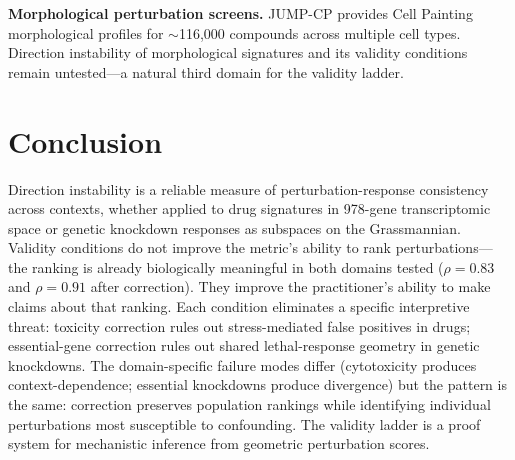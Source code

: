\documentclass{article}
\begin{document}
\textbf{Morphological perturbation screens.} JUMP-CP provides Cell Painting
morphological profiles for ${\sim}$116{,}000 compounds across multiple cell
types. Direction instability of morphological signatures and its validity
conditions remain untested---a natural third domain for the validity ladder.

\section{Conclusion}

Direction instability is a reliable measure of perturbation-response
consistency across contexts, whether applied to drug signatures in 978-gene
transcriptomic space or genetic knockdown responses as subspaces on the
Grassmannian. Validity conditions do not improve the metric's ability to rank
perturbations---the ranking is already biologically meaningful in both
domains tested ($\rho = 0.83$ and $\rho = 0.91$ after correction). They
improve the practitioner's ability to make claims about that ranking. Each
condition eliminates a specific interpretive threat: toxicity correction
rules out stress-mediated false positives in drugs; essential-gene correction
rules out shared lethal-response geometry in genetic knockdowns. The
domain-specific failure modes differ (cytotoxicity produces
context-dependence; essential knockdowns produce divergence) but the pattern
is the same: correction preserves population rankings while identifying
individual perturbations most susceptible to confounding. The validity
ladder is a proof system for mechanistic inference from geometric
perturbation scores.



\end{document}
